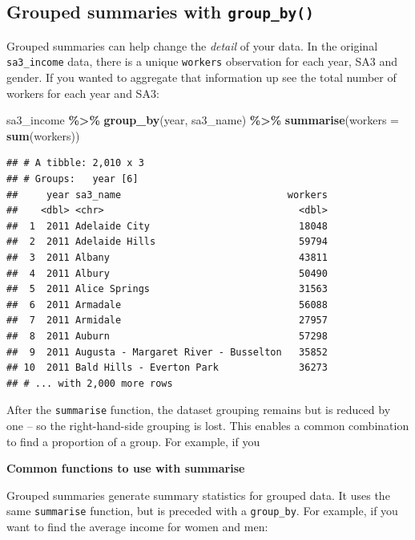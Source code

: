 \documentclass[
]{book}
\newenvironment{Shaded}{\begin{snugshade}}{\end{snugshade}}
\newcommand{\DataTypeTok}[1]{\textcolor[rgb]{0.13,0.29,0.53}{#1}}
\newcommand{\KeywordTok}[1]{\textcolor[rgb]{0.13,0.29,0.53}{\textbf{#1}}}
\newcommand{\NormalTok}[1]{#1}
\newcommand{\OperatorTok}[1]{\textcolor[rgb]{0.81,0.36,0.00}{\textbf{#1}}}
\newcommand{\StringTok}[1]{\textcolor[rgb]{0.31,0.60,0.02}{#1}}
\begin{document}
\hypertarget{grouped-summaries-with-group_by}{%
\subsection{\texorpdfstring{Grouped summaries with \texttt{group\_by()}}{Grouped summaries with group\_by()}}\label{grouped-summaries-with-group_by}}

Grouped summaries can help change the \emph{detail} of your data. In the original \texttt{sa3\_income} data, there is a unique \texttt{workers} observation for each year, SA3 and gender. If you wanted to aggregate that information up see the total number of workers for each year and SA3:

\begin{Shaded}
\begin{Highlighting}[]
\NormalTok{sa3\_income }\OperatorTok{\%\textgreater{}\%}\StringTok{ }
\StringTok{  }\KeywordTok{group\_by}\NormalTok{(year, sa3\_name) }\OperatorTok{\%\textgreater{}\%}\StringTok{ }
\StringTok{  }\KeywordTok{summarise}\NormalTok{(}\DataTypeTok{workers =} \KeywordTok{sum}\NormalTok{(workers))}
\end{Highlighting}
\end{Shaded}

\begin{verbatim}
## # A tibble: 2,010 x 3
## # Groups:   year [6]
##     year sa3_name                             workers
##    <dbl> <chr>                                  <dbl>
##  1  2011 Adelaide City                          18048
##  2  2011 Adelaide Hills                         59794
##  3  2011 Albany                                 43811
##  4  2011 Albury                                 50490
##  5  2011 Alice Springs                          31563
##  6  2011 Armadale                               56088
##  7  2011 Armidale                               27957
##  8  2011 Auburn                                 57298
##  9  2011 Augusta - Margaret River - Busselton   35852
## 10  2011 Bald Hills - Everton Park              36273
## # ... with 2,000 more rows
\end{verbatim}

After the \texttt{summarise} function, the dataset grouping remains but is reduced by one -- so the right-hand-side grouping is lost. This enables a common combination to find a proportion of a group. For example, if you

\textbf{Common functions to use with summarise}

Grouped summaries generate summary statistics for grouped data. It uses the same \texttt{summarise} function, but is preceded with a \texttt{group\_by}. For example, if you want to find the average income for women and men:
\end{document}
